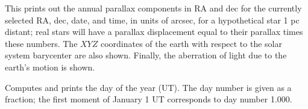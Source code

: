 
This prints out the annual parallax components in RA and 
dec for the currently selected RA, dec, date, and time, in
units of arcsec, for a hypothetical star 1 pc distant; real
stars will have a parallax displacement equal to their 
parallax times these numbers.
The $XYZ$ coordinates of the earth with respect to the
solar system barycenter are also shown.  Finally, the
aberration of light due to the earth's motion is shown.


Computes and prints the day of the year (UT).  The day number
is given as a fraction; the first moment of January 1 UT 
corresponds to day number 1.000. 



